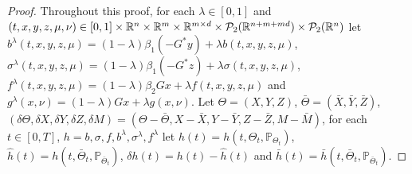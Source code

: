 \documentclass[11pt]{article}
\numberwithin{equation}{section}
\theoremstyle{definition}
\theoremstyle{remark}
\def\b{\beta}  \def\a{\alpha} \def\ga{\gamma}
\def\cP{\mathcal{P}}
\def\sP{\mathbb{P}}
\def\sR{{\mathbb R}}
\begin{document}
\begin{proof}
Throughout this proof, 
for each $\lambda\in [0,1]$ and $(t,x,y,z,\mu,\nu)\in [0,1]\t \sR^n\t\sR^m\t\sR^{m\t d}\t\cP_2(\sR^{n+m+m d})\t \cP_2(\sR^n)$ 
let 
$b^\lambda(t,x,y,z,\mu)=
(1-\lambda)\b_1 (-G^*y)+\lambda b(t,x,y,z,\mu)$,
$\sigma^\lambda(t,x,y,z,\mu)=
(1-\lambda)\b_1 (-G^*z)+\lambda \sigma(t,x,y,z,\mu)$,
$f^\lambda(t,x,y,z,\mu)=
(1-\lambda)\b_2 Gx+\lambda f(t,x,y,z,\mu)$
and $g^\lambda(x,\nu)=(1-\lambda)Gx+\lambda g(x,\nu)$.
Let 
$\Theta=(X, Y, Z)$,  
$\bar{\Theta}=(\bar{X}, \bar{Y}, \bar{Z})$,
$(\delta \Theta, \delta X,\delta Y, \delta Z, \delta M)= ( \Theta-\bar{ \Theta}, X-\bar{X}, Y-\bar{Y}, Z-\bar{Z}, M-\bar{M})$,
for each $t\in [0,T]$, 
$h=b, \sigma, f, b^\lambda, \sigma^\lambda, f^\lambda$
let 
${h}(t)= h(t, {\Theta}_t,\sP_{{\Theta}_t})$,
$\hat{h}(t)= h(t, \bar{\Theta}_t,\sP_{\bar{\Theta}_t})$,
$\delta {h}(t)=h(t)- \hat{h}(t)$
and $\bar{h}(t)= \bar{h}(t, \bar{\Theta}_t,\sP_{\bar{\Theta}_t})$.



\end{proof}
\end{document}
